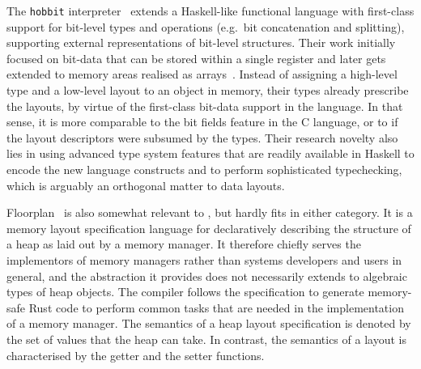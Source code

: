 The \texttt{hobbit} interpreter~\citep{Diatchki_JL_05} extends a Haskell-like functional language with
first-class support for bit-level types and operations (e.g.\ bit concatenation
and splitting), supporting external
representations of bit-level structures. Their work initially focused on
bit-data that can be stored within a single register and later gets extended
to memory areas realised as arrays~\citep{Diatchki_Jones_06}.
Instead of assigning a high-level type
and a low-level layout to an object in memory, their types already prescribe
the layouts, by virtue of the first-class bit-data support in the language. In
that sense, it is more comparable to the bit fields feature in the C language,
or to \cogent if the \dargent layout descriptors were subsumed by the \cogent types.
Their research novelty also lies in using advanced type system features that are readily
available in Haskell to encode the new language constructs and to perform
sophisticated typechecking, which is arguably an orthogonal
matter to data layouts.

Floorplan~\citep{Cronburg:2019} is also somewhat
relevant to \dargent, but hardly fits in either category. It is a
memory layout specification language for declaratively describing the
structure of a heap as laid out by a memory manager.
It therefore chiefly serves the implementors of memory managers rather than
systems developers and users in general, and the abstraction it provides
does not necessarily extends to algebraic types of heap objects.
The compiler follows the specification to generate memory-safe Rust code to perform
common tasks that are needed in the implementation of a memory manager.
The semantics of a heap layout
specification is denoted by the set of values that the heap can take.
In contrast, the semantics of a \dargent layout is characterised by the getter
and the setter functions.

